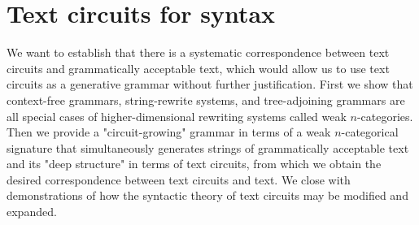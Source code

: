



\maketitle%

\tableofcontents{}

\chapter{Text circuits for syntax}\label{chapter:textcircuits}
We want to establish that there is a systematic correspondence between text circuits and grammatically acceptable text, which would allow us to use text circuits as a generative grammar without further justification. First we show that context-free grammars, string-rewrite systems, and tree-adjoining grammars are all special cases of higher-dimensional rewriting systems called weak $n$-categories. Then we provide a "circuit-growing" grammar in terms of a weak $n$-categorical signature that simultaneously generates strings of grammatically acceptable text and its "deep structure" in terms of text circuits, from which we obtain the desired correspondence between text circuits and text. We close with demonstrations of how the syntactic theory of text circuits may be modified and expanded.
\label{sec:ncat}
\newpage

\newpage

%






